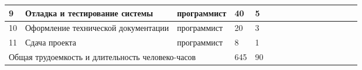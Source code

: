 \begin{landscape}
\begin{longtable}[h]{| p{} | p{} | p{} | p{} | p{} | c | c | c | c | c | c | c | c | c | c | c |}
    \hline
      9  & Отладка и тестирование системы               & программист & 40  & 5  & & & & & & & & & \cellcolor{gray} & & \\
    \hline
      10 & Оформление технической документации          & программист & 20  & 3  & & & & & & & & & & \cellcolor{gray} & \\
    \hline
      11 & Сдача проекта                                & программист & 8   & 1  & & & & & & & & & & & \cellcolor{gray} \\
    \hline
      \multicolumn{3}{|p{0.565\textwidth}|}{Общая трудоемкость и длительность человеко-часов} & 645 & 90 & & & & & & & & & & & \\
    \hline
  \end{longtable}
\end{landscape}
